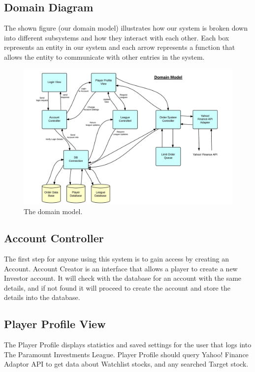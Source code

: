 \pagebreak
\subsection {Domain Diagram}
The shown figure (our domain model) illustrates how our system is broken down into different subsystems and how they interact with each other. Each box represents an entity in our system and each arrow represents a function that allows the entity to communicate with other entries in the system.

\begin{figure}[H]
\centering
\includegraphics[width=5.5in]{./img/domModel.jpg}
\caption{The domain model.}
\end{figure}

\subsection{Account Controller}
The first step for anyone using this system is to gain access by creating an Account.
Account Creator is an interface that allows a player to create a new Investor account.
It will check with the database for an account with the same details, and if not found
it will proceed to create the account and store the details into the database.\\

\subsection{Player Profile View}
The Player Profile displays statistics and saved settings for the user that logs
into The Paramount Investments League. Player Profile should query Yahoo! Finance
Adaptor API to get data about Watchlist stocks, and any searched Target stock.\\

